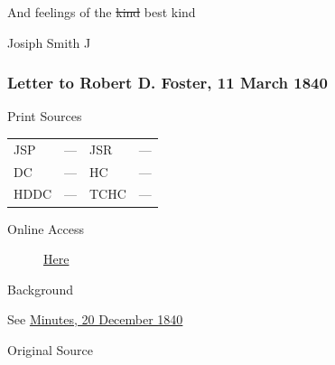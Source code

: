 				\begin{tightright}
					And feelings of the \sout{kind} best kind

					Josiph Smith J
				\end{tightright}
				
		\subsubsection{Letter to Robert D. Foster, 11 March 1840}
			\label{EMS-1840-JS-11-MAR-1840}
			
			\begin{description}
				\item[Print Sources]
			\end{description}

			\begin{tabular}{p{0.5in}p{1in}p{0.5in}p{1in}}
				JSP	 	& ---		& JSR 		& --- \\
				DC	 	& ---		& HC 		& --- \\
				HDDC 	& ---		& TCHC 		& --- \\
			\end{tabular}
			
			\begin{description}
				\item[Online Access] \href{https://www.josephsmithpapers.org/paper-summary/letter-to-robert-d-foster-11-march-1840/1}{Here}
			\end{description}
			
			\begin{description}
				\item[Background]
			\end{description}
			
				See \href{https://www.josephsmithpapers.org/paper-summary/minutes-20-december-1840/1}{Minutes, 20 December 1840}
			
			
			\begin{description}
				\item[Original Source]
			\end{description}
			

